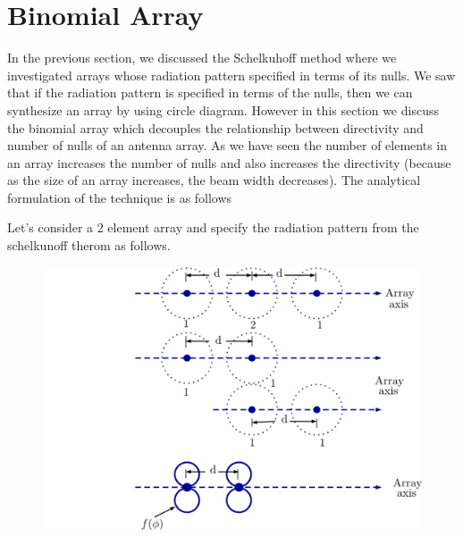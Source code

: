 \chapter{Binomial Array}	
In the previous section, we discussed the Schelkuhoff method where we investigated arrays whose radiation pattern specified in terms of its nulls. We saw that if the radiation pattern is specified in terms of the nulls, then we can synthesize an array by using circle diagram. However in this section we discuss the binomial array which decouples the relationship between directivity and number of nulls of an antenna array. As we have seen the number of elements in an array increases the number of nulls and also increases the directivity (because as the size of an array increases, the beam width decreases). The analytical formulation of the technique is as follows

Let's consider a 2 element array and specify the radiation pattern from the schelkunoff therom as follows.\\
\begin{figure}[h]
\centering
\includegraphics[width=1\linewidth]{"./graphics/img59_9"}
\caption{}
\label{fig:fig-11}
\end{figure}


